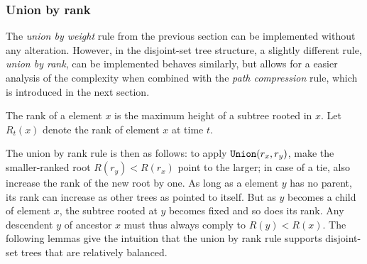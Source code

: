 \subsubsection{Union by rank}

The \emph{union by weight} rule from the previous section can be implemented without any alteration. However, in the disjoint-set tree structure, a slightly different rule, \emph{union by rank}, can be implemented behaves similarly, but allows for a easier analysis of the complexity when combined with the \emph{path compression} rule, which is introduced in the next section. 

\begin{definition}
  The rank of a element $x$ is the maximum height of a subtree rooted in $x$. Let $R_t(x)$ denote the rank of element $x$ at time $t$. 
\end{definition}

The union by rank rule is then as follows: to apply $\texttt{Union}(r_x,r_y)$, make the smaller-ranked root $R(r_y) < R(r_x)$ point to the larger; in case of a tie, also increase the rank of the new root by one. As long as a element $y$ has no parent, its rank can increase as other trees as pointed to itself. But as $y$ becomes a child of element $x$, the subtree rooted at $y$ becomes fixed and so does its rank. Any descendent $y$ of ancestor $x$ must thus always comply to $R(y)<R(x)$. The following lemmas give the intuition that the union by rank rule supports disjoint-set trees that are relatively balanced.

